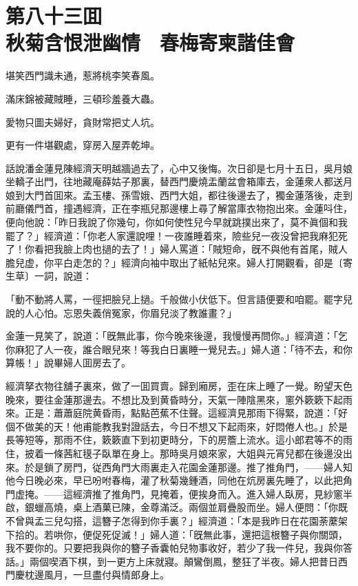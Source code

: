 
\chapter*{第八十三囬　\\秋菊含恨泄幽情　春梅寄柬諧佳會}


\begin{myquote}
堪笑西門識未通，惹將桃李笑春風。

滿床錦被藏賊睡，三頓珍羞養大蟲。

愛物只圖夫婦好，貪財常把丈人坑。

更有一件堪觀處，穿房入屋弄乾坤。
\end{myquote}

話說潘金蓮見陳經濟天明越牆過去了，心中又後悔。次日卻是七月十五日，吳月娘坐轎子出門，往地藏庵薛姑子那裏，替西門慶燒盂蘭盆會箱庫去，金蓮衆人都送月娘到大門首囬來。孟玉樓、孫雪娥、西門大姐，都往後邊去了，獨金蓮落後，走到前廳儀門首，撞遇經濟，正在李瓶兒那邊樓上尋了解當庫衣物抱出來。金蓮呌住，便向他說：「昨日我說了你幾句，你如何使性兒今早就跳撲出來了，莫不眞個和我罷了？」經濟道：「你老人家還說哩！一夜誰睡着來，險些兒一夜没曾把我麻犯死了！你看把我臉上肉也撾的去了！」婦人罵道：「賊短命，旣不與他有首尾，賊人膽兒虚，你平白走怎的？」經濟向袖中取出了紙帖兒來。婦人打開觀看，卻是〔寄生草〕一詞，說道：

\begin{myquote}
「動不動將人罵，一徑把臉兒上撾。千般做小伏低下。但言語便要和咱罷。罷字兒說的人心怕。忘恩失義俏冤家，你眉兒淡了教誰畫？」
\end{myquote}

金蓮一見笑了，說道：「旣無此事，你今晚來後邊，我慢慢再問你。」經濟道：「乞你麻犯了人一夜，誰合眼兒來！等我白日裏睡一覺兒去。」婦人道：「待不去，和你算帳！」說畢婦人囬房去了。

經濟拏衣物往舖子裏來，做了一囬買賣。歸到廂房，歪在床上睡了一覺。盼望天色晚來，要往金蓮那邊去。不想比及到黄昏時分，天氣一陣陰黑來，窻外簌簌下起雨來。正是：蕭蕭庭院黄昏雨，點點芭蕉不住聲。這經濟見那雨下得緊，說道：「好個不做美的天！他甫能教我對證話去，今日不想又下起雨來，好悶倦人也。」於是長等短等，那雨不住，簌簌直下到初更時分，下的房簷上流水。這小郎君等不的雨住，披着一條茜紅氁子臥單在身上。那時吳月娘來家，大姐與元宵兒都在後邊没出來。於是鎖了房門，従西角門大雨裏走入花園金蓮那邊。推了推角門，——婦人知他今日晚必來，早已吩咐春梅，灌了秋菊幾鍾酒，同他在炕房裏先睡了，以此把角門虚掩。——這經濟推了推角門，見掩着，便挨身而入。進入婦人臥房，見紗窻半啟，銀蠟高燒，桌上酒菓已陳，金尊滿泛。兩個並肩疊股而坐。婦人便問：「你既不曾與孟三兒勾搭，這簪子怎得到你手裏？」經濟道：「本是我昨日在花園荼䕷架下拾的。若哄你，便促死促滅！」婦人道：「旣無此事，還把這根簪子與你關頭，我不要你的。只要把我與你的簪子香囊帕兒物事收好，若少了我一件兒，我與你答話。」兩個喫酒下棋，到一更方上床就寢。顛鸞倒鳳，整狂了半夜。婦人把昔日西門慶枕邊風月，一旦盡付與情郎身上。

